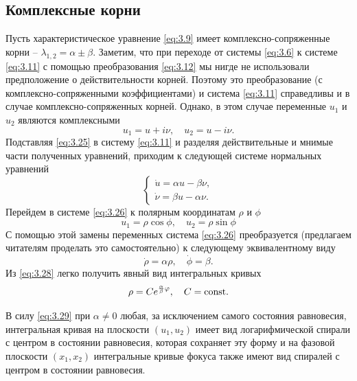 \subsection{Комплексные корни}%
\label{sub:3.2.2}

Пусть характеристическое уравнение \eqref{eq:3.9}  имеет комплексно-сопряженные корни -- $\lambda_{1,2} = \alpha \pm \beta $.
Заметим, что при переходе от системы \eqref{eq:3.6} к системе \eqref{eq:3.11} с помощью преобразования \eqref{eq:3.12}  мы нигде не использовали предположение о действительности корней. Поэтому это преобразование (с комплексно-сопряженными коэффициентами) и система \eqref{eq:3.11} справедливы и в случае комплексно-сопряженных корней. Однако, в этом случае переменные $u_1$ и $u_2$ являются комплексными
\begin{equation}
        \label{eq:3.25}
        u_1 = u+i \nu, \quad u_2= u - i \nu.
\end{equation}
Подставляя \eqref{eq:3.25} в систему \eqref{eq:3.11}  и разделяя действительные и мнимые части полученных уравнений, приходим к следующей системе нормальных уравнений
\begin{equation}
        \label{eq:3.26}
        \begin{cases}
                \dot u = \alpha u -\beta \nu,\\ 
               \dot \nu = \beta u - \alpha \nu.
        \end{cases}
\end{equation}
Перейдем в системе \eqref{eq:3.26} к полярным координатам $\rho$ и $\phi$ 
\begin{equation}
        \label{eq:3.27}
        u_1= \rho \cos \phi,\quad u_2= \rho \sin \phi
\end{equation}
С помощью этой замены переменных система \eqref{eq:3.26} преобразуется (предлагаем читателям проделать это самостоятельно) к следующему эквивалентному виду
\begin{equation}
        \label{eq:3.28}
       \dot \rho = \alpha \rho, \quad \dot \phi = \beta. 
\end{equation}
Из \eqref{eq:3.28} легко получить явный вид интегральных кривых
\begin{equation}
        \label{eq:3.29}
        \rho = C e^{ \frac{\alpha}{\beta} \varphi}, \quad C=\textrm{const}.
\end{equation}


В силу \eqref{eq:3.29} при $ \alpha \neq 0$ любая, за исключением самого состояния равновесия, интегральная кривая на плоскости $( u_1, u_2)$ имеет вид логарифмической спирали с центром в состоянии равновесия, которая сохраняет эту форму и на фазовой плоскости $(x_1, x_2)$ интегральные кривые фокуса также имеют вид спиралей с центром в состоянии равновесия. 

